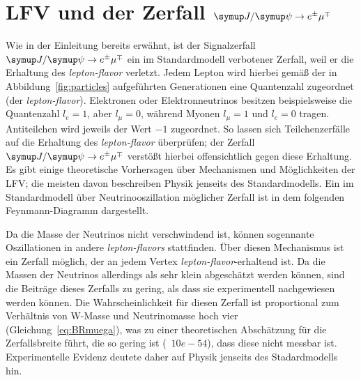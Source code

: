 \section{\texorpdfstring{LFV und der Zerfall $\signal$}{Jpsi to eµ}}
%
Wie in der Einleitung bereits erwähnt, ist der Signalzerfall $\signal$ ein im Standardmodell verbotener Zerfall, weil er die Erhaltung des \textit{lepton-flavor} verletzt. Jedem Lepton wird hierbei gemäß der in Abbildung~\ref{fig:particles} aufgeführten Generationen eine Quantenzahl zugeordnet (der \textit{lepton-flavor}). Elektronen oder Elektronneutrinos besitzen beispielsweise die Quantenzahl $l_e=1$, aber $l_\mu=0$, während Myonen $l_\mu=1$ und $l_e=0$ tragen. Antiteilchen wird jeweils der Wert $-1$ zugeordnet. So lassen sich Teilchenzerfälle auf die Erhaltung des \textit{lepton-flavor} überprüfen; der Zerfall $\signal$ verstößt hierbei offensichtlich gegen diese Erhaltung.\\
%
Es gibt einige theoretische Vorhersagen über Mechanismen und Möglichkeiten der LFV; die meisten davon beschreiben Physik jenseits des Standardmodells. Ein im Standardmodell über Neutrinooszillation möglicher Zerfall ist in dem folgenden Feynmann-Diagramm dargestellt.
%
\begin{figure}[H]
  \centering
  \label{fig:lfv_nu}
\end{figure}
%
Da die Masse der Neutrinos nicht verschwindend ist, können sogennante Oszillationen in andere \textit{lepton-flavors} stattfinden. Über diesen Mechanismus ist ein Zerfall möglich, der an jedem Vertex \textit{lepton-flavor}-erhaltend ist. Da die Massen der Neutrinos allerdings als sehr klein abgeschätzt werden können, sind die Beiträge dieses Zerfalls zu gering, als dass sie experimentell nachgewiesen werden können. Die Wahrscheinlichkeit für diesen Zerfall ist proportional zum Verhältnis von W-Masse und Neutrinomasse hoch vier (Gleichung~\ref{eq:BRmuega}), was zu einer theoretischen Abschätzung für die Zerfallsbreite führt, die so gering ist (~$\si{10e-54}$), dass diese nicht messbar ist. Experimentelle Evidenz deutete daher auf Physik jenseits des Stadardmodells hin.
